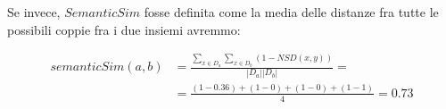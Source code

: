 Se invece, $SemanticSim$ fosse definita come la media delle distanze fra tutte le possibili coppie fra i due insiemi avremmo: 

\begin{align*}
	semanticSim(a,b)&=\frac{\sum\limits_{x \in D_a} \sum\limits_{x \in D_b}  (1-NSD(x,y))}{|D_a||D_b|}=\\
	&=\frac{(1-0.36)+(1-0)+(1-0)+(1-1)}{4}=0.73
\end{align*}